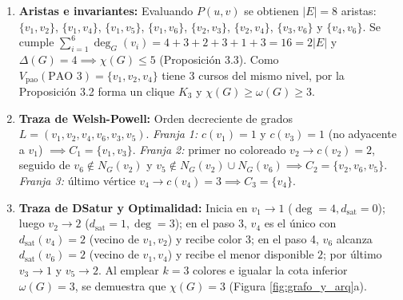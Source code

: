 \documentclass[12pt,a4paper]{article}
\theoremstyle{definition}
\begin{document}
\begin{enumerate}
    \item \textbf{Aristas e invariantes:} Evaluando $P(u, v)$ se obtienen $|E| = 8$ aristas: $\{v_1, v_2\}$, $\{v_1, v_4\}$, $\{v_1, v_5\}$, $\{v_1, v_6\}$, $\{v_2, v_3\}$, $\{v_2, v_4\}$, $\{v_3, v_6\}$ y $\{v_4, v_6\}$. Se cumple $\sum_{i=1}^6 \deg_G(v_i) = 4+3+2+3+1+3 = 16 = 2|E|$ y $\Delta(G) = 4 \implies \chi(G) \le 5$ (Proposición 3.3). Como $V_{\text{pao}}(\text{PAO 3}) = \{v_1, v_2, v_4\}$ tiene 3 cursos del mismo nivel, por la Proposición 3.2 forma un clique $K_3$ y $\chi(G) \ge \omega(G) \ge 3$.
    \item \textbf{Traza de Welsh-Powell:} Orden decreciente de grados $L = (v_1, v_2, v_4, v_6, v_3, v_5)$. \textit{Franja 1:} $c(v_1)=1$ y $c(v_3)=1$ (no adyacente a $v_1$) $\implies C_1 = \{v_1, v_3\}$. \textit{Franja 2:} primer no coloreado $v_2 \to c(v_2)=2$, seguido de $v_6 \notin N_G(v_2)$ y $v_5 \notin N_G(v_2) \cup N_G(v_6) \implies C_2 = \{v_2, v_6, v_5\}$. \textit{Franja 3:} último vértice $v_4 \to c(v_4)=3 \implies C_3 = \{v_4\}$.
    \item \textbf{Traza de DSatur y Optimalidad:} Inicia en $v_1 \to 1$ ($\deg=4, d_{\text{sat}}=0$); luego $v_2 \to 2$ ($d_{\text{sat}}=1, \deg=3$); en el paso 3, $v_4$ es el único con $d_{\text{sat}}(v_4) = 2$ (vecino de $v_1, v_2$) y recibe color $3$; en el paso 4, $v_6$ alcanza $d_{\text{sat}}(v_6) = 2$ (vecino de $v_1, v_4$) y recibe el menor disponible $2$; por último $v_3 \to 1$ y $v_5 \to 2$. Al emplear $k = 3$ colores e igualar la cota inferior $\omega(G) = 3$, se demuestra que $\chi(G) = 3$ (Figura \ref{fig:grafo_y_arq}a).
\end{enumerate}
\end{document}
